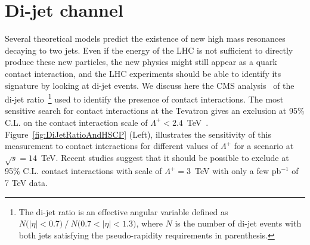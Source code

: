 \documentclass{cmspaper}
\begin{document}
\section{Di-jet channel} \label{dijet}
Several theoretical models predict the existence of new 
high mass resonances decaying to two jets.
Even if the energy of the LHC is not sufficient to directly produce 
these new particles, the new physics might still appear as 
a quark contact interaction,
and the LHC experiments should be able to identify its signature 
by looking at di-jet events.
We discuss here the CMS analysis~\cite{DIJETSNOTE}
of the di-jet ratio~\footnote{
The di-jet ratio is an effective angular variable
defined as $N\mbox{(}|\eta|<0.7\mbox{)}~/~N\mbox{(}0.7<|\eta|< 1.3 \mbox{)}$, 
where $N$ is the number of di-jet events with both jets satisfying the 
pseudo-rapidity requirements in parenthesis.} 
used to identify the presence of contact interactions. 
The most sensitive search for contact interactions at the Tevatron 
gives an exclusion at 95\% C.L. on the contact interaction scale 
of $\Lambda^{+} < 2.4$~TeV~\cite{Abbott:1998wh}.  
Figure~\ref{fig:DiJetRatioAndHSCP} (Left), illustrates the sensitivity of this measurement to 
contact interactions for different values of $\Lambda^{+}$ for a scenario at $\sqrt{s} = 14$~TeV.
Recent studies suggest that it should be possible to exclude at 95\% C.L. contact interactions with scale of
$\Lambda^{+}=3$~TeV with only a few pb$^{-1}$ of 7 TeV data.
\end{document}
